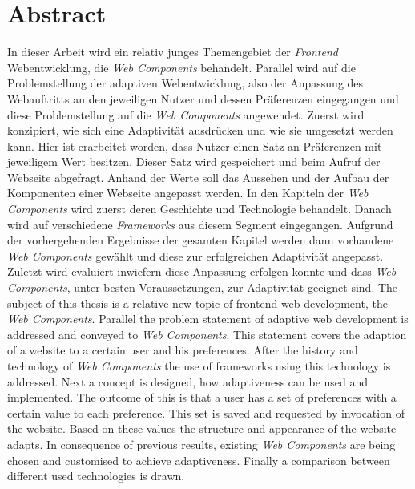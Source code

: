 \documentclass[12pt, paper=a4, bibtotoc, toc=listof, headsepline=true]{scrreprt}
\newcommand{\listoflistings}{\listof{listing}{Listing Verzeichnis}}
\begin{document}









\chapter*{Abstract}
In dieser Arbeit wird ein relativ junges Themengebiet der \emph{Frontend} Webentwicklung, die \emph{Web Components} behandelt. Parallel wird auf die Problemstellung der adaptiven Webentwicklung, also der Anpassung des Webauftritts an den jeweiligen Nutzer und dessen Präferenzen eingegangen und diese Problemstellung auf die \emph{Web Components} angewendet. Zuerst wird konzipiert, wie sich eine Adaptivität ausdrücken und wie sie umgesetzt werden kann. Hier ist erarbeitet worden, dass Nutzer einen Satz an Präferenzen mit jeweiligem Wert besitzen. Dieser Satz wird gespeichert und beim Aufruf der Webseite abgefragt. Anhand der Werte soll das Aussehen und der Aufbau der Komponenten einer Webseite angepasst werden.
In den Kapiteln der \emph{Web Components} wird zuerst deren Geschichte und Technologie behandelt. Danach wird auf verschiedene \emph{Frameworks} aus diesem Segment eingegangen. Aufgrund der vorhergehenden Ergebnisse der gesamten Kapitel werden dann vorhandene \emph{Web Components} gewählt und diese zur erfolgreichen Adaptivität angepasst. Zuletzt wird evaluiert inwiefern diese Anpassung erfolgen konnte und dass \emph{Web Components}, unter besten Voraussetzungen, zur Adaptivität geeignet sind.     
\newline
\newline
The subject of this thesis is a relative new topic of frontend web development, the \emph{Web Components}. Parallel the problem statement of adaptive web development is addressed and conveyed to \emph{Web Components}. This statement covers the adaption of a website to a certain user and his preferences. After the history and technology of \emph{Web Components} the use of frameworks using this technology is addressed. Next a concept is designed, how adaptiveness can be used and implemented. The outcome of this is that a user has a set of preferences with a certain value to each preference. This set is saved and requested by invocation of the website. Based on these values the structure and appearance of the website adapts. In consequence of previous results, existing \emph{Web Components} are being chosen and customised to achieve adaptiveness. Finally a comparison between different used technologies is drawn.    
\listoflistings
\listoffigures
\end{document}
